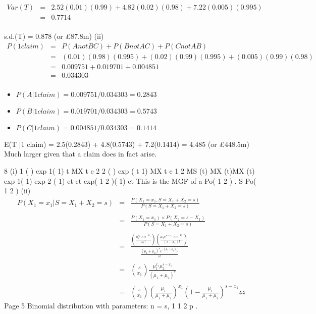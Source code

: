 \documentclass[a4paper,12pt]{article}
\begin{document}
\begin{eqnarray*}
Var(T) &=& 2.52(0.01)(0.99) + 4.82(0.02)(0.98) + 7.22(0.005)(0.995)\\ &=& 0.7714\\
\end{eqnarray*}

s.d.(T) = 0.878 (or £87.8m)
(ii) 
\begin{eqnarray*}
P(1 claim) &=& P(A not BC) + P(B not AC) + P(C not AB)\\
&=& (0.01)(0.98)(0.995) + (0.02)(0.99)(0.995) + (0.005)(0.99)(0.98)\\
&=& 0.009751 + 0.019701 + 0.004851 \\
&=& 0.034303\\
\end{eqnarray*}


\begin{itemize}
    \item $P(A|1 claim) = 0.009751/0.034303 = 0.2843$
\item $P(B|1 claim) = 0.019701/0.034303 = 0.5743$
\item $P(C|1 claim) = 0.004851/0.034303 = 0.1414$
\end{itemize}
E(T |1 claim) = 2.5(0.2843) + 4.8(0.5743) + 7.2(0.1414) = 4.485
(or £448.5m)
Much larger given that a claim does in fact arise.



8 (i)
1 ( ) exp{ 1( 1)} t
MX t e
2 2 ( ) exp{ ( t 1)}
MX t e
1 2
MS (t) MX (t)MX (t)
exp{ 1( 1)} exp{ 2 ( 1)} et et
exp{( 1 2 )( 1)} et
This is the MGF of a Po( 1 2 ) .
S Po( 1 2 )
(ii) 
{
\large
\begin{eqnarray*}
P(X_1 =x_1|S = X_1+X_2 = s) &=&
\frac{P(X_1 =x_1,S = X_1+X_2 = s)}{P(S = X_1+X_2 = s)} \\
& & \\
&=& \frac{P(X_1 =x_1) \times P(X_2 = s-X_1)}{P(S = X_1+X_2 = s)} \\
& & \\
&=& \frac{  \left(\frac{\mu_1^{x_1} \times e^{-\mu_1}}{x_1!}\right)\left(\frac{\mu_2e^{s-x_2} \times e^{-\mu_1} }{(s-x_1)!}\right)  }{ \frac{ (\mu_1+\mu_2)^s e^{-(\mu_1 + \mu_2)})}{s!}}  \\
& & \\
&=&  {s \choose x_1}\frac{\mu_1^{x_1} \mu_2^{s-x_1}}{(\mu_1 + \mu_2)^s} \\
& & \\
&=&  {s \choose x_1} \left( \frac{\mu_1}{\mu_1 + \mu_2} \right)^{x_1} \left( 1- \frac{\mu_1}{\mu_1 + \mu_2} \right)^{s-x_1}zz
\end{eqnarray*}
}
Page 5
Binomial distribution with parameters: n = s, 1
1 2
p .
\end{document}
